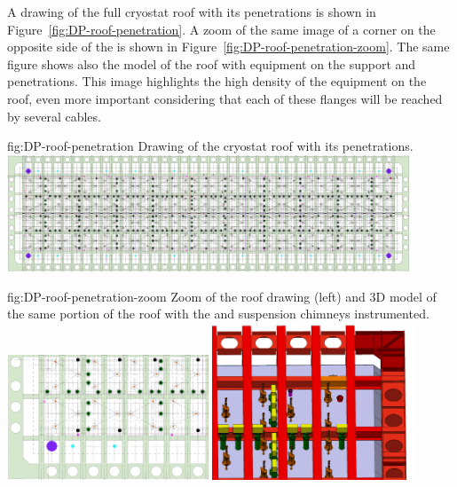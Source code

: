 A drawing of the full cryostat roof with its penetrations is shown in Figure~\ref{fig:DP-roof-penetration}.
A zoom of the same image of a corner on the opposite side of the  is shown in Figure~\ref{fig:DP-roof-penetration-zoom}.
The same figure shows also the \threed model of the roof with equipment on the  support and  penetrations.
This image highlights the high density of the equipment on the  roof, even more important considering that each of these flanges will be reached by several cables.

\begin{dunefigure}{fig:DP-roof-penetration}
{Drawing of the cryostat roof with its penetrations.}
\includegraphics[width=0.9\textwidth]{graphics/DP-roof-penetration.png}
\end{dunefigure}

\begin{dunefigure}{fig:DP-roof-penetration-zoom}
{Zoom of the  roof drawing (left) and 3D model of the same portion of the roof with the  and  suspension chimneys instrumented.}
\includegraphics[width=0.45\textwidth]{graphics/DP-roof-penetration-zoom.png}
\includegraphics[width=0.45\textwidth]{graphics/DP-roof-penetration-3D.png}
\end{dunefigure}

